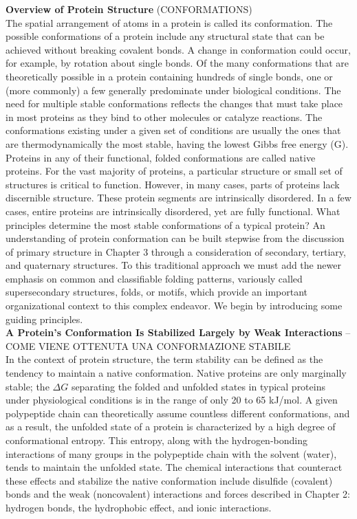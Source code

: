 \textbf{Overview of Protein Structure} (CONFORMATIONS)\\
The spatial arrangement of atoms in a protein is called its conformation. 
The possible conformations of a protein include any structural state that can be achieved without breaking covalent bonds. A change in conformation could occur, for example, by rotation about single bonds. Of the many conformations that are theoretically possible in a protein containing hundreds of single bonds, one or (more commonly) a few generally predominate under biological conditions. The need for multiple stable conformations reflects the changes that must take place in most proteins as they bind to other molecules or catalyze reactions. 
The conformations existing under a given set of conditions are usually the ones that are thermodynamically the most stable, having the lowest Gibbs free energy (G). Proteins in any of their functional, folded conformations are called native proteins.
For the vast majority of proteins, a particular structure or small set of structures is critical to function. However, in many cases, parts of proteins lack discernible structure. These protein segments are intrinsically disordered. In a few cases, entire proteins are intrinsically disordered, yet are fully functional. What principles determine the most stable conformations of a typical protein? An understanding of protein conformation can be built stepwise from the discussion of primary structure in Chapter 3 through a consideration of secondary, tertiary, and quaternary structures. 
To this traditional approach we must add the newer emphasis on common and classifiable folding patterns, variously called supersecondary structures, folds, or motifs, which provide an important organizational context to this complex endeavor. We begin by introducing some guiding principles. 
\\



\textbf{A Protein’s Conformation Is Stabilized Largely by Weak Interactions} -- COME VIENE OTTENUTA UNA CONFORMAZIONE STABILE\\
In the context of protein structure, the term stability can be defined as the tendency to maintain a native conformation. Native proteins are only marginally stable; the $\Delta G$ separating the folded and unfolded states in typical proteins under physiological conditions is in the range of only 20 to 65 kJ/mol. A given polypeptide chain can theoretically assume countless different conformations, and as a result, the unfolded state of a protein is characterized by a high degree of conformational entropy. This entropy, along with the hydrogen-bonding interactions of many groups in the polypeptide chain with the solvent (water), tends to maintain the unfolded state. 
The chemical interactions that counteract these effects and stabilize the native conformation include disulfide (covalent) bonds and the weak (noncovalent) interactions and forces described in Chapter 2: hydrogen bonds, the hydrophobic effect, and ionic interactions. 

